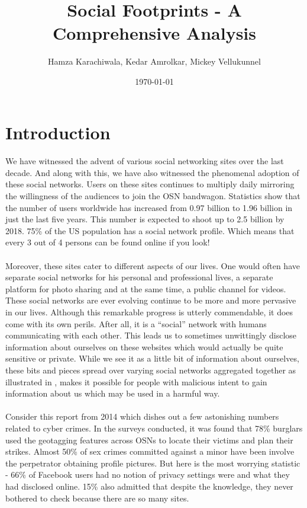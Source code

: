 \documentclass[11pt]{article}
\title{Social Footprints - A Comprehensive Analysis}
\author{Hamza Karachiwala, Kedar Amrolkar, Mickey Vellukunnel}
\date{\today}
\begin{document}
\maketitle
{}

\section{Introduction}
\paragraph{}
We have witnessed the advent of various social networking sites over the last decade. And along with this, we have also witnessed the phenomenal adoption of these social networks. Users on these sites continues to multiply daily mirroring the willingness of the audiences to join the OSN bandwagon. Statistics show\cite{statswebsite} that the number of users worldwide has increased from 0.97 billion to 1.96 billion in just the last five years. This number is expected to shoot up to 2.5 billion by 2018. 75\% of the US population has a social network profile. Which means that every 3 out of 4 persons can be found online if you look! 
\paragraph{}
Moreover, these sites cater to different aspects of our lives. One would often have separate social networks for his personal and professional lives, a separate platform for photo sharing and at the same time, a public channel for videos. These social networks are ever evolving continue to be more and more pervasive in our lives. Although this remarkable progress is utterly commendable, it does come with its own perils. After all, it is a “social” network with humans communicating with each other. This leads us to sometimes unwittingly disclose information about ourselves on these websites which would actually be quite sensitive or private. While we see it as a little bit of information about ourselves, these bits and pieces spread over varying social networks aggregated together as illustrated in \cite{privacypaper}, makes it possible for people with malicious intent to gain information about us which may be used in a harmful way.
\paragraph{}
Consider this report\cite{newsarticle} from 2014 which dishes out a few astonishing numbers related to cyber crimes. In the surveys conducted, it was found that 78\% burglars used the geotagging features across OSNs to locate their victims and plan their strikes. Almost 50\% of sex crimes committed against a minor have been involve the perpetrator obtaining profile pictures. But here is the most worrying statistic - 66\% of Facebook users had no notion of privacy settings were and what they had disclosed online. 15\% also admitted that despite the knowledge, they never bothered to check because there are so many sites.
\end{document}
